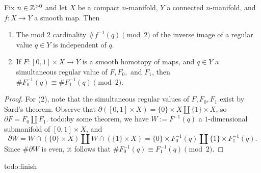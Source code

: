 \begin{theorem}
    Fix $n \in \mathbb{Z}^{>0}$ and let $X$ be a compact $n$-manifold, $Y$ a connected $n$-manifold, and $f \colon X \to Y$ a smooth map. Then 
    \begin{enumerate}[label=(\arabic*)]
    \setlength\itemsep{-.2em}
\item The mod 2 cardinality $\# f^{-1}(q)\pmod 2$ of the inverse image of a regular value $q \in Y$ is independent of $q$.
\item If $F \colon [0,1] \times X \to Y$ is a smooth homotopy of maps, and $q \in Y$ a simultaneous regular value of $F,F_0,$ and $F_1$, then $\#F_0^{-1}(q)\equiv \# F_1^{-1}(q)\pmod 2$.
    \end{enumerate}
\end{theorem}
\begin{proof}
    For (2), note that the simultaneous regular values of $F,F_0,F_1$ exist by Sard's theorem. Observe that $\partial ([0,1]\times X)=\{0\} \times X \amalg \{1\} \times X$, so $\partial F=F_0 \amalg F_1$. {\color{red}todo:by some theorem}, we have $W:= F^{-1}(q)$ a $1$-dimensional submanifold of $[0,1]\times X$, and \[
        \partial W=W\cap (\{0\} \times X)\amalg W \cap (\{1\} \times X)=\{0\} \times F_0^{-1}(q)\amalg \{1\} \times F_1^{-1}(q).
    \] Since $\# \partial W$ is even, it follows that $\# F_0^{-1}(q)\equiv F_1^{-1}(q)\pmod 2$.
\end{proof}

{\color{red}todo:finish} 
